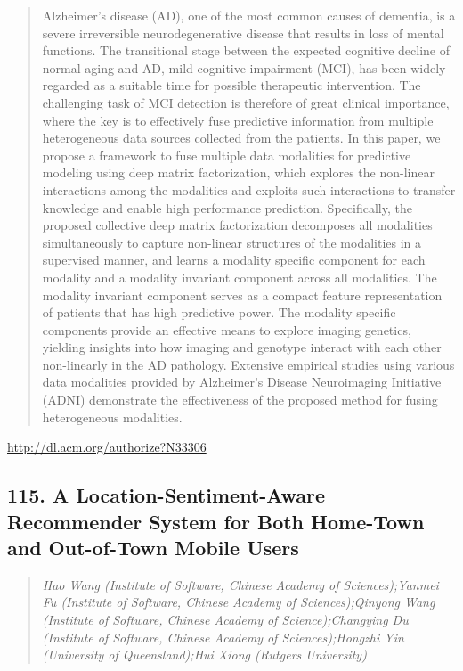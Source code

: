 \documentclass{article}
\begin{document}
\begin{quote}
Alzheimer’s disease (AD), one of the most common causes of dementia, is a severe irreversible neurodegenerative disease that results in loss of mental functions. The transitional stage between the expected cognitive decline of normal aging and AD, mild cognitive impairment (MCI), has been widely regarded as a suitable time for possible therapeutic intervention. The challenging task of MCI detection is therefore of great clinical importance, where the key is to effectively fuse predictive information from multiple heterogeneous data sources collected from the patients. In this paper, we propose a framework to fuse multiple data modalities for predictive modeling using deep matrix factorization, which explores the non-linear interactions among the modalities and exploits such interactions to transfer knowledge and enable high performance prediction. Specifically, the proposed collective deep matrix factorization decomposes all modalities simultaneously to capture non-linear structures of the modalities in a supervised manner, and learns a modality specific component for each modality and a modality invariant component across all modalities. The modality invariant component serves as a compact feature representation of patients that has high predictive power. The modality specific components provide an effective means to explore imaging genetics, yielding insights into how imaging and genotype interact with each other non-linearly in the AD pathology. Extensive empirical studies using various data modalities provided by Alzheimer’s Disease Neuroimaging Initiative (ADNI) demonstrate the effectiveness of the proposed method for fusing heterogeneous modalities.
\end{quote}

\href{http://dl.acm.org/authorize?N33306}{http://dl.acm.org/authorize?N33306}

\subsection{115. A Location-Sentiment-Aware Recommender System for Both Home-Town and Out-of-Town Mobile Users}

\begin{quote}
\footnotesize{\textit{Hao Wang (Institute of Software, Chinese Academy of Sciences);Yanmei Fu (Institute of Software, Chinese Academy of Sciences);Qinyong Wang (Institute of Software, Chinese Academy of Science);Changying Du (Institute of Software, Chinese Academy of Sciences);Hongzhi Yin (University of Queensland);Hui Xiong (Rutgers University)}}

\end{quote}
\end{document}
